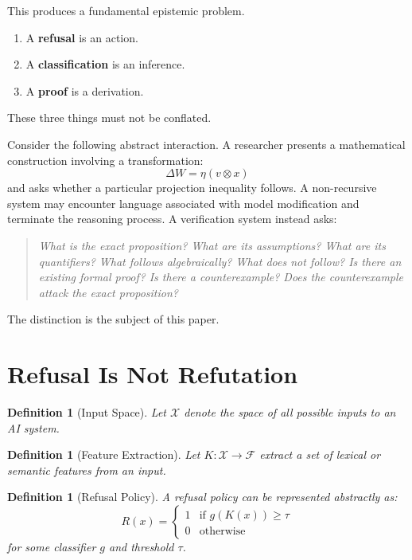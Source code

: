\documentclass[11pt,a4paper]{article}
\newtheorem{definition}[theorem]{Definition}
\begin{document}
This produces a fundamental epistemic problem.

\begin{enumerate}
\item A \textbf{refusal} is an action.
\item A \textbf{classification} is an inference.
\item A \textbf{proof} is a derivation.
\end{enumerate}

These three things must not be conflated.

Consider the following abstract interaction. A researcher presents a mathematical construction involving a transformation:
\[
\Delta W = \eta(v \otimes x)
\]
and asks whether a particular projection inequality follows. A non-recursive system may encounter language associated with model modification and terminate the reasoning process. A verification system instead asks:

\begin{quote}
\textit{What is the exact proposition? What are its assumptions? What are its quantifiers? What follows algebraically? What does not follow? Is there an existing formal proof? Is there a counterexample? Does the counterexample attack the exact proposition?}
\end{quote}

The distinction is the subject of this paper.

\section{Refusal Is Not Refutation}

\begin{definition}[Input Space]
Let $\mathcal{X}$ denote the space of all possible inputs to an AI system.
\end{definition}

\begin{definition}[Feature Extraction]
Let $K : \mathcal{X} \to \mathcal{F}$ extract a set of lexical or semantic features from an input.
\end{definition}

\begin{definition}[Refusal Policy]
A refusal policy can be represented abstractly as:
\[
R(x) = \begin{cases} 1 & \text{if } g(K(x)) \geq \tau \\ 0 & \text{otherwise} \end{cases}
\]
for some classifier $g$ and threshold $\tau$.
\end{definition}
\end{document}
